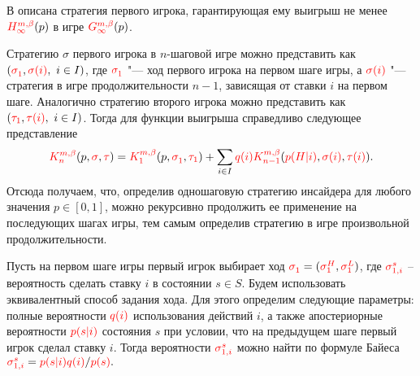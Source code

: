 В  описана стратегия первого игрока, гарантирующая ему выигрыш не менее $\H*{\infty}(p)$ в игре $\theG*{\infty}(p)$.

Стратегию $\sigma$ первого игрока в $n$-шаговой игре можно представить как $(\sigmas{1}, \sigmara{i},\ i \in I)$, где $\sigmas{1}$ "--- ход первого игрока на первом шаге игры, а $\textcolor{red}{\sigma(i)}$ "--- стратегия в игре продолжительности $n-1$, зависящая от ставки $i$ на первом шаге.
Аналогично стратегию второго игрока можно представить как $(\textcolor{red}{\tau_{1}}, \textcolor{red}{\tau(i)},\ i \in I)$.
Тогда для функции выигрыша справедливо следующее представление
\begin{equation}
  \label{ch1:eq:recursive-structure}
  \K*{n}(p,\sigmar,\taur) = 
  \K*{1}(p,\sigmas{1},\taus{1}) + \sum_{i \in I} \qc{i} \K*{n-1}(\pac{H}{i},\sigmara{i},\taura{i}).
\end{equation}
Отсюда получаем, что, определив одношаговую стратегию инсайдера для любого значения $p \in [0,1]$, можно рекурсивно продолжить ее применение на последующих шагах игры, тем самым определив стратегию в игре произвольной продолжительности.

Пусть на первом шаге игры первый игрок выбирает ход %
$\sigmas{1} = (\sigmas[H]{1}, \sigmas[L]{1})$, где %
$\sigmasc[s]{i}$ -- вероятность сделать ставку $i$ в состоянии $s \in S$.
%
Будем использовать эквивалентный способ задания хода.
Для этого определим следующие параметры: полные вероятности $\textcolor{red}{q(i)}$ использования действий $i$, а также апостериорные вероятности $\textcolor{red}{p(s|i)}$ состояния $s$ при условии, что на предыдущем шаге первый игрок сделал ставку $i$.
Тогда вероятности $\sigmasc[s]{i}$ можно найти по формуле Байеса
$
  \sigmasc[s]{i} = \pac{s}{i}\qc{i}/\pc{s}.
$

